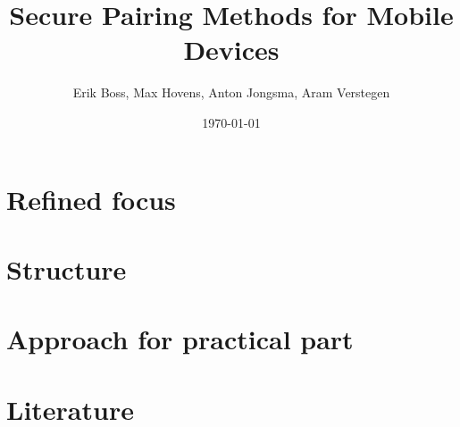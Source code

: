 \documentclass{article}
\title{Secure Pairing Methods for Mobile Devices}
\date{\today}
\author{Erik Boss, Max Hovens, Anton Jongsma, Aram Verstegen}
\begin{document}
\section{Refined focus}

\section{Structure}

\section{Approach for practical part}

\section{Literature}
\end{document}
